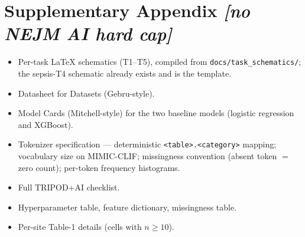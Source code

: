 \documentclass[11pt]{article}
\newcommand{\note}[1]{{\color{notecolor}\textit{[#1]}}}
\begin{document}
\section*{Supplementary Appendix \note{no NEJM AI hard cap}}
\begin{itemize}[leftmargin=1.5em]
  \item Per-task LaTeX schematics (T1--T5), compiled from
        \texttt{docs/task\_schematics/}; the sepsis-T4 schematic
        \citep{kamran2024sepsis} already exists and is the template.
  \item Datasheet for Datasets (Gebru-style).
  \item Model Cards (Mitchell-style) for the two baseline models
        (logistic regression and XGBoost).
  \item Tokenizer specification --- deterministic
        \texttt{<table>.<category>} mapping; vocabulary size on
        MIMIC-CLIF; missingness convention (absent token $=$ zero
        count); per-token frequency histograms.
  \item Full TRIPOD+AI checklist.
  \item Hyperparameter table, feature dictionary, missingness table.
  \item Per-site Table-1 details (cells with $n \ge 10$).
\end{itemize}



\end{document}
